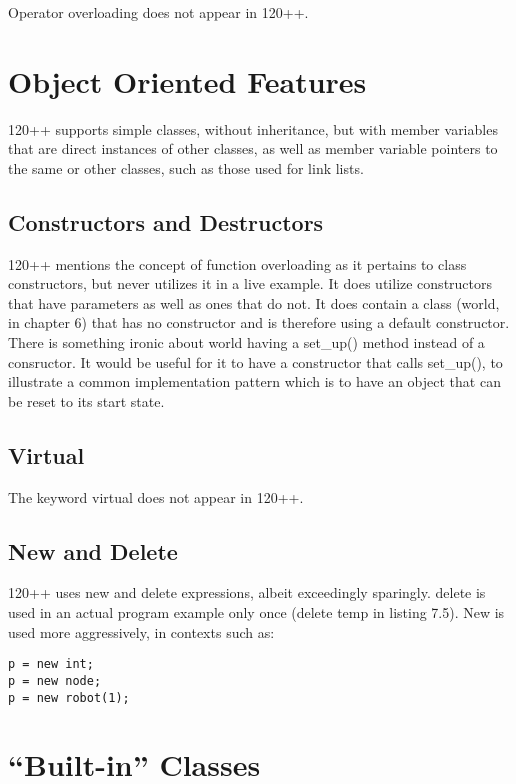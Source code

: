 Operator overloading does not appear in 120++.

\section{Object Oriented Features}

120++ supports simple classes, without inheritance, but with
member variables that are direct instances of other classes,
as well as member variable pointers to the same or other classes,
such as those used for link lists.

\subsection{Constructors and Destructors}

120++ mentions the concept of function overloading as it pertains to
class constructors, but never utilizes it in a live example. It does
utilize constructors that have parameters as well as ones that do not.
It does contain a class (world, in chapter 6) that has no constructor
and is therefore using a default constructor.  There is something ironic
about world having a set\_up() method instead of a consructor. It would
be useful for it to have a constructor that calls set\_up(), to illustrate
a common implementation pattern which is to have an object that can be
reset to its start state.

\subsection{Virtual}

The keyword virtual does not appear in 120++.

\subsection{New and Delete}

120++ uses new and delete expressions, albeit exceedingly sparingly.
delete is used in an actual program example only once (delete temp
in listing 7.5).  New is used more aggressively, in contexts such as:

\begin{verbatim}
p = new int;
p = new node;
p = new robot(1);
\end{verbatim}

\section{``Built-in'' Classes}

